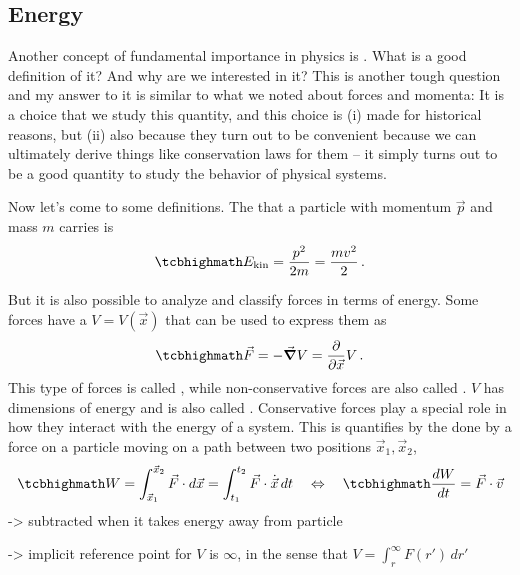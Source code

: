 \documentclass[../class_mech_main.tex]{subfiles}
\begin{document}
		\subsection{Energy}
Another concept of fundamental importance in physics is . What is a good definition of it? And why are we interested in it? This is another tough question and my answer to it is similar to what we noted about forces and momenta: It is a choice that we study this quantity, and this choice is (i) made for historical reasons, but (ii) also because they turn out to be convenient because we can ultimately derive things like conservation laws for them -- it simply turns out to be a good quantity to study the behavior of physical systems.

Now let's come to some definitions. The  that a particle with momentum $\vec{p}$ and mass $m$ carries is
\begin{equation}
	\eqbox{
		E_\mathrm{kin} = \frac{p^2}{2 m} = \frac{m v^2}{2}
	} \, .
\end{equation}


But it is also possible to analyze and classify forces in terms of energy. Some forces have a  $V = V(\vec{x})$ that can be used to express them as
\begin{equation}\label{eq:conservative_force}
	\eqbox{
		\vec{F} = - \grad V = \pdv{\vec{x}} V
	} \, .
\end{equation}
This type of forces is called , while non-conservative forces are also called . $V$ has dimensions of energy and is also called . Conservative forces play a special role in how they interact with the energy of a system. This is quantifies by the  done by a force on a particle moving on a path between two positions $\vec{x}_1, \vec{x}_2$,
\begin{equation}\label{eq:work}
	\eqbox{
		W = \int_{\vec{x}_1}^{\vec{x}_2} \vec{F} \cdot d\vec{x} = \int_{t_1}^{t_2} \vec{F} \cdot \dot{\vec{x}} \, dt
	}
	\quad \Leftrightarrow \quad
	\eqbox{
		\dv{W}{t} = \vec{F} \cdot \vec{v}
	}
\end{equation}
-> subtracted when it takes energy away from particle

-> implicit reference point for $V$ is $\infty$, in the sense that $V = \int_r^\infty F(r')\, dr'$
\end{document}
